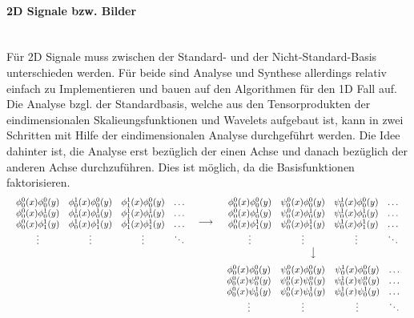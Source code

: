 \documentclass{article}
\begin{document}
\paragraph{2D Signale bzw. Bilder}~\\
Für 2D Signale muss zwischen der Standard- und der Nicht-Standard-Basis unterschieden werden. Für beide sind Analyse und Synthese allerdings relativ einfach zu Implementieren und bauen auf den Algorithmen für den 1D Fall auf.
Die Analyse bzgl. der Standardbasis, welche aus den Tensorprodukten der eindimensionalen Skalieungsfunktionen und Wavelets aufgebaut ist, kann in zwei Schritten mit Hilfe der eindimensionalen Analyse durchgeführt werden. Die Idee dahinter ist, die Analyse erst bezüglich der einen Achse und danach bezüglich der anderen Achse durchzuführen. Dies ist möglich, da die Basisfunktionen faktorisieren.
%
\[
\begin{array}{ccc}
{
\begin{array}{cccc}
\phi_0^0(x)\phi_0^0(y) & \phi_0^1(x)\phi_0^0(y) & \phi_1^1(x)\phi_0^0(y) & \hdots \\
\phi_0^0(x)\phi_0^1(y) & \phi_0^1(x)\phi_0^1(y) & \phi_1^1(x)\phi_0^1(y) & \hdots \\
\phi_0^0(x)\phi_1^1(y) & \phi_0^1(x)\phi_1^1(y) & \phi_1^1(x)\phi_1^1(y) & \hdots \\
\vdots & \vdots & \vdots & \ddots \\
\end{array}
} &
\longrightarrow &
{
\begin{array}{cccc}
\phi_0^0(x)\phi_0^0(y) & \psi_0^0(x)\phi_0^0(y) & \psi_0^1(x)\phi_0^0(y) & \hdots \\
\phi_0^0(x)\phi_0^1(y) & \psi_0^0(x)\phi_0^1(y) & \psi_0^1(x)\phi_0^1(y) & \hdots \\
\phi_0^0(x)\phi_1^1(y) & \psi_0^0(x)\phi_1^1(y) & \psi_0^1(x)\phi_1^1(y) & \hdots \\
\vdots & \vdots & \vdots & \ddots \\
\end{array}
} \\
 &
 &
\big\downarrow \\[.25cm]
 &
 &
{
\begin{array}{cccc}
\phi_0^0(x)\phi_0^0(y) & \psi_0^0(x)\phi_0^0(y) & \psi_0^1(x)\phi_0^0(y) & \hdots \\
\phi_0^0(x)\psi_0^0(y) & \psi_0^0(x)\psi_0^0(y) & \psi_0^1(x)\psi_0^0(y) & \hdots \\
\phi_0^0(x)\psi_0^1(y) & \psi_0^0(x)\psi_0^1(y) & \psi_0^1(x)\psi_0^1(y) & \hdots \\
\vdots & \vdots & \vdots & \ddots \\
\end{array}
}
\end{array}
\]
\end{document}
